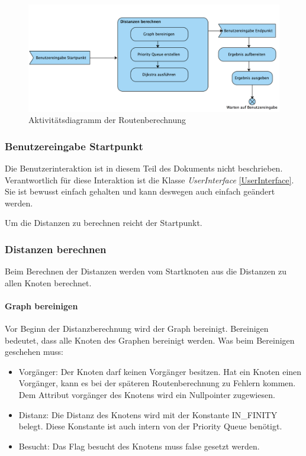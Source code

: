 \documentclass[12pt, a4paper, ngerman]{article}
\begin{document}
\begin{figure}[H] 
  \centering
     \includegraphics[width=1.0\textwidth]{Grafiken/aktivitaetsDiagrammDijkstra.jpg}
  \caption{Aktivitätsdiagramm der Routenberechnung}
  \label{fig:uebersichtRoutenberechnung}
\end{figure}

\subsubsection{Benutzereingabe Startpunkt}
Die Benutzerinteraktion ist in diesem Teil des Dokuments nicht beschrieben. Verantwortlich für diese Interaktion ist die Klasse \textit{UserInterface} \ref{UserInterface}. Sie ist bewusst einfach gehalten und kann deswegen auch einfach geändert werden.

Um die Distanzen zu berechnen reicht der Startpunkt.

\subsubsection{Distanzen berechnen \label{distanzenBerechnen}}
Beim Berechnen der Distanzen werden vom Startknoten aus die Distanzen zu allen Knoten berechnet.

\paragraph{Graph bereinigen}
Vor Beginn der Distanzberechnung wird der Graph bereinigt. Bereinigen bedeutet, dass alle Knoten des Graphen bereinigt werden. Was beim Bereinigen geschehen muss:
\begin{itemize}
	\item Vorgänger: Der Knoten darf keinen Vorgänger besitzen. Hat ein Knoten einen Vorgänger, kann es bei der späteren Routenberechnung zu Fehlern kommen. Dem Attribut vorgänger des Knotens wird ein Nullpointer zugewiesen.
	\item Distanz: Die Distanz des Knotens wird mit der Konstante IN\_FINITY belegt. Diese Konstante ist auch intern von der Priority Queue benötigt.
	\item Besucht: Das Flag besucht des Knotens muss false gesetzt werden.
\end{itemize}
\end{document}
